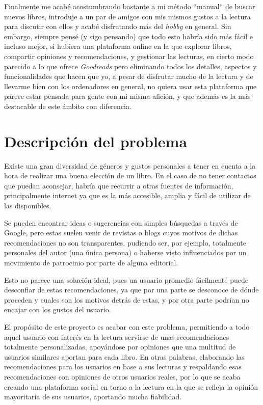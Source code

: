 Finalmente me acabé acostumbrando bastante a mi método ``manual`` de buscar nuevos libros, introduje a un par de amigos con mis mismos gustos a la lectura para discutir con ellos y acabé disfrutando más del \textit{hobby} en general. Sin embargo, siempre pensé (y sigo pensando) que todo esto habría sido más fácil e incluso mejor, si hubiera una plataforma online en la que explorar libros, compartir opiniones y recomendaciones, y gestionar las lecturas, en cierto modo parecido a lo que ofrece \textit{Goodreads} pero eliminando todos los detalles, aspectos y funcionalidades que hacen que yo, a pesar de disfrutar mucho de la lectura y de llevarme bien con los ordenadores en general, no quiera usar esta plataforma que parece estar pensada para gente con mi misma afición, y que además es la más destacable de este ámbito con diferencia.

\section{Descripción del problema}

Existe una gran diversidad de géneros y gustos personales a tener en cuenta a la hora de realizar una buena elección de un libro. En el caso de no tener contactos que puedan aconsejar, habría que recurrir a otras fuentes de información, principalmente internet ya que es la más accesible, amplia y fácil de utilizar de las disponibles.

Se pueden encontrar ideas o sugerencias con simples búsquedas a través de Google, pero estas suelen venir de revistas o blogs cuyos motivos de dichas recomendaciones no son transparentes, pudiendo ser, por ejemplo, totalmente personales del autor (una única persona) o haberse visto influenciados por un movimiento de patrocinio por parte de alguna editorial.

Esto no parece una solución ideal, pues un usuario promedio fácilmente puede desconfiar de estas recomendaciones, ya que por una parte se desconoce de dónde proceden y cuales son los motivos detrás de estas, y por otra parte podrían no encajar con los gustos del usuario.

El propósito de este proyecto es acabar con este problema, permitiendo a todo aquel usuario con interés en la lectura servirse de unas recomendaciones totalmente personalizadas, apoyándose por opiniones que una multitud de usuarios similares aportan para cada libro. En otras palabras, elaborando las recomendaciones para los usuarios en base a sus lecturas y respaldando esas recomendaciones con opiniones de otros usuarios reales, por lo que se acaba creando una plataforma social en torno a la lectura en la que se refleja la opinión mayoritaria de sus usuarios, aportando mucha fiabilidad.

